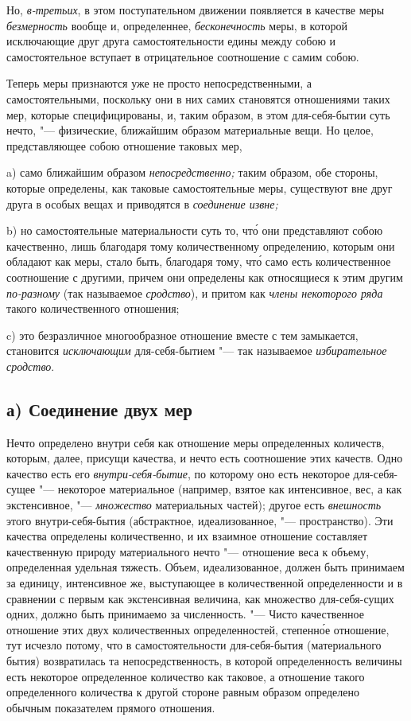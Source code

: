 Но, {\em в-третьих}, в этом поступательном движении появляется в качестве меры
{\em безмерность} вообще и, определеннее, {\em бесконечность} меры, в которой
исключающие друг друга самостоятельности едины между собою и самостоятельное
вступает в отрицательное соотношение с самим собою.


Теперь меры признаются уже не просто непосредственными, а самостоятельными,
поскольку они в них самих становятся отношениями таких мер, которые
специфицированы, и, таким образом, в этом для-себя-бытии суть нечто, "---
физические, ближайшим образом материальные вещи. Но целое, представляющее
собою отношение таковых мер,

a) само ближайшим образом {\em непосредственно;} таким образом, обе стороны,
которые определены, как таковые самостоятельные меры, существуют вне друг друга
в особых вещах и приводятся в {\em соединение извне;}

b) но самостоятельные материальности суть то, чт\'{о} они представляют собою
качественно, лишь благодаря тому количественному определению, которым они
обладают как меры, стало быть, благодаря тому, чт\'{о} само есть количественное
соотношение с другими, причем они определены как относящиеся к этим другим
{\em по-разному} (так называемое {\em сродство}), и притом как
{\em члены некоторого ряда} такого количественного отношения;

c) это безразличное многообразное отношение вместе с тем замыкается,
становится {\em исключающим} для-себя-бытием "--- так называемое
{\em избирательное сродство}.

\subsection[а) Соединение двух мер]{а) Соединение двух мер}

Нечто определено внутри себя как отношение меры определенных количеств,
которым, далее, присущи качества, и нечто есть соотношение этих качеств. Одно
качество есть его {\em внутри-себя-бытие}, по которому оно есть некоторое
для-себя-сущее "--- некоторое материальное (например, взятое как интенсивное,
вес, а как экстенсивное, "--- {\em множество} материальных частей); другое есть
{\em внешность} этого внутри-себя-бытия (абстрактное, идеализованное, "---
пространство). Эти качества определены количественно, и их взаимное отношение
составляет качественную природу материального нечто "--- отношение веса к
объему, определенная удельная тяжесть. Объем, идеализованное, должен быть
принимаем за единицу, интенсивное же, выступающее в количественной
определенности и в сравнении с первым как экстенсивная величина, как множество
для-себя-сущих одних, должно быть принимаемо за численность. "--- Чисто
качественное отношение этих двух количественных определенностей, степенн\'{о}е
отношение, тут исчезло потому, что в самостоятельности для-себя-бытия
(материального бытия) возвратилась та непосредственность, в которой
определенность величины есть некоторое определенное количество как таковое, а
отношение такого определенного количества к другой стороне равным образом
определено обычным показателем прямого отношения.

